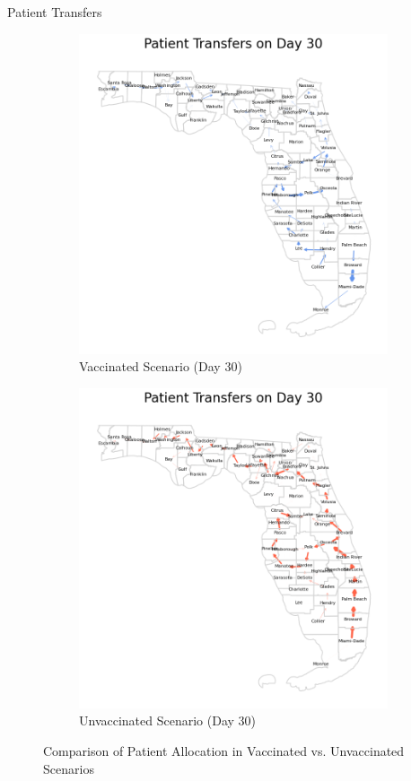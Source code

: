 \documentclass[aspectratio=169,xcolor=dvipsnames]{beamer}
\begin{document}
\begin{frame}{Patient Transfers}
    \begin{figure}[h]
        \centering
        \begin{subfigure}{0.445\linewidth}
            \centering
            \includegraphics[width=0.85\linewidth]{pics/travel_day_30_Vax0.1.png}
            \caption{Vaccinated Scenario (Day 30)}\label{fig:patientAllocVax}
        \end{subfigure}
        \hspace{2em}
        \begin{subfigure}{0.445\linewidth}
            \centering
            \includegraphics[width=0.85\linewidth]{pics/travel_day_30_NoVax.png}
            \caption{Unvaccinated Scenario (Day 30)}\label{fig:patientAllocNoVax}
        \end{subfigure}
        \caption{Comparison of Patient Allocation in Vaccinated vs. Unvaccinated Scenarios}\label{fig:patientAlloc}
    \end{figure}
\end{frame}
\end{document}
